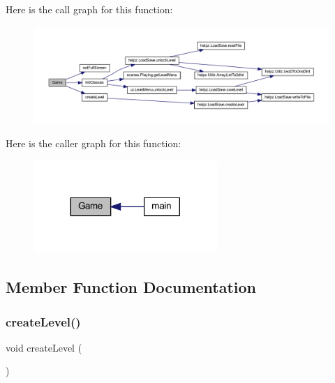 Here is the call graph for this function\+:\nopagebreak
\begin{figure}[H]
\begin{center}
\leavevmode
\includegraphics[width=350pt]{classprogetto_1_1_game_a98d87ba6bde3f389e92664a2ef9bfcb1_cgraph}
\end{center}
\end{figure}
Here is the caller graph for this function\+:\nopagebreak
\begin{figure}[H]
\begin{center}
\leavevmode
\includegraphics[width=197pt]{classprogetto_1_1_game_a98d87ba6bde3f389e92664a2ef9bfcb1_icgraph}
\end{center}
\end{figure}


\subsection{Member Function Documentation}
\mbox{\label{classprogetto_1_1_game_ad79f312dd3a9e52f38a9e5f1536537fd}} 
\subsubsection{\texorpdfstring{create\+Level()}{createLevel()}}
{\footnotesize\ttfamily void create\+Level (\begin{DoxyParamCaption}{ }\end{DoxyParamCaption})}



